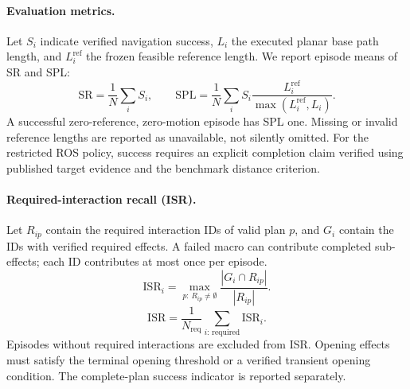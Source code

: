 \paragraph{Evaluation metrics.}
Let $S_i$ indicate verified navigation success, $L_i$ the executed planar
base path length, and $L_i^{\mathrm{ref}}$ the frozen feasible reference
length. We report episode means of SR and SPL:
\begin{equation}
\mathrm{SR}=\frac{1}{N}\sum_i S_i,\qquad
\mathrm{SPL}=\frac{1}{N}\sum_i
 S_i\frac{L_i^{\mathrm{ref}}}{\max(L_i^{\mathrm{ref}},L_i)}.
\end{equation}
A successful zero-reference, zero-motion episode has SPL one. Missing or
invalid reference lengths are reported as unavailable, not silently omitted.
For the restricted ROS policy, success requires an explicit completion claim
verified using published target evidence and the benchmark distance criterion.

\paragraph{Required-interaction recall (ISR).}
Let $R_{ip}$ contain the required interaction IDs of valid plan $p$, and
$G_i$ contain the IDs with verified required effects. A failed macro can
contribute completed sub-effects; each ID contributes at most once per episode.
\begin{equation}
\mathrm{ISR}_i=\max_{p:\,R_{ip}\ne\emptyset}
 \frac{|G_i\cap R_{ip}|}{|R_{ip}|}.
\end{equation}
\begin{equation}
\mathrm{ISR}=\frac{1}{N_{\mathrm{req}}}
 \sum_{i:\,\mathrm{required}}\mathrm{ISR}_i.
\end{equation}
Episodes without required interactions are excluded from ISR. Opening effects
must satisfy the terminal opening threshold or a verified transient opening
condition. The complete-plan success indicator is reported separately.

